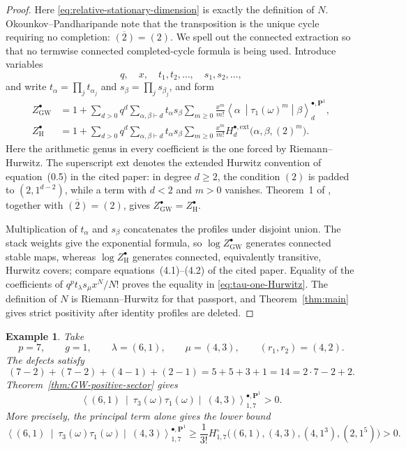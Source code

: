 \documentclass[10pt,a4paper]{amsart}
\newtheorem{example}[theorem]{Example}
\numberwithin{equation}{section}
\begin{document}
\begin{proof}
Here \eqref{eq:relative-stationary-dimension} is exactly the definition of
$N$.  Okounkov--Pandharipande note that the transposition is the unique
cycle requiring no completion: $\overline{(2)}=(2)$.  We spell out the
connected extraction so that no termwise connected completed-cycle formula
is being used.  Introduce variables
\[
 q,\quad x,\quad t_1,t_2,\ldots,\quad s_1,s_2,\ldots,
\]
and write $t_\alpha=\prod_jt_{\alpha_j}$ and
$s_\beta=\prod_js_{\beta_j}$, and form
\begin{align*}
 Z^\bullet_{\mathrm{GW}}
 &=1+\sum_{d>0}q^d\sum_{\alpha,\beta\vdash d}
   t_\alpha s_\beta\sum_{m\geq0}\frac{x^m}{m!}
   \left\langle\alpha\ \middle|\tau_1(\omega)^m
   \middle|\beta\right\rangle^{\bullet,\mathbf P^1}_{d},\\
 Z^\bullet_{\mathrm H}
 &=1+\sum_{d>0}q^d\sum_{\alpha,\beta\vdash d}
   t_\alpha s_\beta\sum_{m\geq0}\frac{x^m}{m!}
   H^{\bullet,\mathrm{ext}}_d\bigl(\alpha,\beta,(2)^m\bigr).
\end{align*}
Here the arithmetic genus in every coefficient is the one forced by
Riemann--Hurwitz.  The superscript $\mathrm{ext}$ denotes the extended
Hurwitz convention of equation~(0.5) in the cited paper: in degree
$d\geq2$, the condition $(2)$ is padded to $(2,1^{d-2})$, while a term with
$d<2$ and $m>0$ vanishes.  Theorem~1 of
\cite{OkounkovPandharipande}, together with
$\overline{(2)}=(2)$, gives
$Z^\bullet_{\mathrm{GW}}=Z^\bullet_{\mathrm H}$.

Multiplication of $t_\alpha$ and $s_\beta$ concatenates the profiles under
disjoint union.  The stack weights give the exponential formula, so
$\log Z^\bullet_{\mathrm{GW}}$ generates connected stable maps, whereas
$\log Z^\bullet_{\mathrm H}$ generates connected, equivalently transitive,
Hurwitz covers; compare equations~(4.1)--(4.2) of the cited paper.  Equality
of the coefficients of $q^pt_\lambda s_\mu x^N/N!$ proves the equality in
\eqref{eq:tau-one-Hurwitz}.  The definition of $N$ is Riemann--Hurwitz for
that passport, and Theorem~\ref{thm:main} gives strict positivity after
identity profiles are deleted.
\end{proof}

\begin{example}\label{ex:degree-seven-GW}
Take
\[
 p=7,\qquad g=1,\qquad
 \lambda=(6,1),\qquad \mu=(4,3),\qquad (r_1,r_2)=(4,2).
\]
The defects satisfy
\[
 (7-2)+(7-2)+(4-1)+(2-1)=5+5+3+1=14=2\cdot7-2+2.
\]
Theorem~\ref{thm:GW-positive-sector} gives
\[
 \left\langle(6,1)\ \middle|\
  \tau_3(\omega)\tau_1(\omega)
  \middle|\ (4,3)\right\rangle^{\bullet,\mathbf P^1}_{1,7}>0.
\]
More precisely, the principal term alone gives the lower bound
\[
 \left\langle(6,1)\ \middle|\
  \tau_3(\omega)\tau_1(\omega)
  \middle|\ (4,3)\right\rangle^{\bullet,\mathbf P^1}_{1,7}
 \geq\frac1{3!}
 H^\circ_{1,7}\bigl((6,1),(4,3),(4,1^3),(2,1^5)\bigr)>0.
\]
\end{example}
\end{document}

